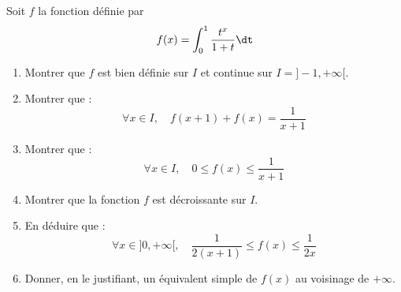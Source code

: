 \documentclass[a4paper,10pt]{report}
\begin{document}
\begin{Exa} Soit $f$ la fonction d\'efinie par 
$$f(x)=\int_0^1 \frac{t^x}{1+t} \dt$$
	\begin{enumerate}
	\item Montrer que $f$ est bien d\'efinie sur $I$ et continue sur $I=]-1, + \infty[$.

	\item Montrer que :
$$\forall x\in I,\quad f(x+1)+f(x)=\frac1{x+1}$$

	\item Montrer que :
$$\forall x\in I,\quad 0\le f(x) \le \frac1{x+1}$$

	\item Montrer que la fonction $f$ est d\'ecroissante sur $I$.

	\item En d\'eduire que :
$$\forall x\in]0,+\infty[,\quad \frac1{2(x+1)} \le f(x) \le \frac1{2x}$$

	\item Donner, en le justifiant, un \'equivalent simple de $f(x)$ au voisinage de $+\infty$.
	\end{enumerate}
\end{Exa}

\corr 
\end{document}
